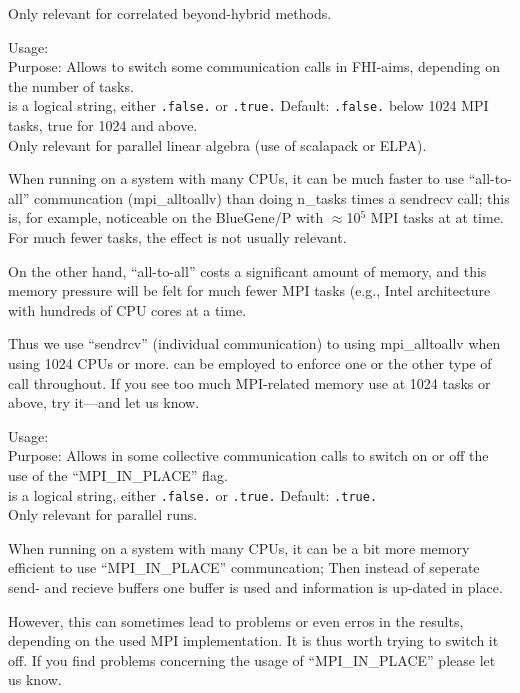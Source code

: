 Only relevant for correlated beyond-hybrid methods.


{
  \noindent
  Usage:   \\[1.0ex]
  Purpose: Allows to switch some communication calls in FHI-aims, 
    depending on the number of tasks. \\[1.0ex]
   is a logical string, either \texttt{.false.} or
    \texttt{.true.} Default: \texttt{.false.} below 1024 MPI tasks, true for 1024 and above.\\  
}
Only relevant for parallel linear algebra (use of scalapack or ELPA).

When running on a system with many CPUs, it can be much faster to use
``all-to-all'' communcation (mpi\_alltoallv) than doing n\_tasks times
a sendrecv call; this is, for example, noticeable on the BlueGene/P
with $\approx$10$^5$ MPI tasks at at time. For much fewer tasks, the
effect is not usually relevant.

On the other hand, ``all-to-all'' costs a significant amount of
memory, and this memory pressure will be felt for much fewer MPI tasks 
(e.g., Intel architecture with hundreds of CPU cores at a time. 

Thus we use ``sendrcv'' (individual communication) to using
mpi\_alltoallv when using 1024 CPUs or more. 
can be employed to enforce one or the other type of call
throughout. If you see too much MPI-related memory use at 1024 tasks
or above, try it---and let us know.

{
  \noindent
  Usage:   \\[1.0ex]
  Purpose: Allows in some collective communication calls to switch on
  or off the use of the ``MPI\_IN\_PLACE'' flag. \\[1.0ex]
   is a logical string, either \texttt{.false.} or
    \texttt{.true.} Default: \texttt{.true.} \\  
}
Only relevant for parallel runs.

When running on a system with many CPUs, it can be a bit more memory
efficient to use ``MPI\_IN\_PLACE'' communcation; Then instead of 
seperate send- and recieve buffers one buffer is used and information
is up-dated in place.

However, this can sometimes lead to problems or even erros in the
results, depending on the used MPI implementation. It is thus worth 
trying to switch it off. If you find problems concerning the usage of
``MPI\_IN\_PLACE'' please let us know.

